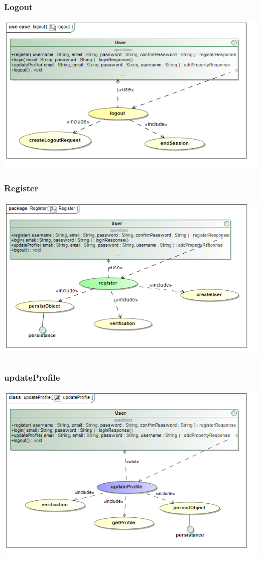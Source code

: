 \documentclass[a4paper,12pt]{article}
\begin{document}
\subsubsection{Logout}
\includegraphics[width=1\textwidth]{./Images/newDiagrams/requiredFunctionality/Diana/logout.png}
\subsubsection{Register}
\includegraphics[width=1\textwidth]{./Images/newDiagrams/requiredFunctionality/Diana/register.png}
\subsubsection{updateProfile}
\includegraphics[width=1\textwidth]{./Images/newDiagrams/requiredFunctionality/Diana/updateProfile.png}
\end{document}
